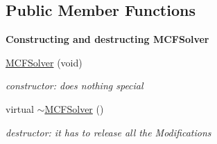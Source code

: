 \subsection*{Public Member Functions}
\begin{Indent}\textbf{ Constructing and destructing M\+C\+F\+Solver}\par
\begin{DoxyCompactItemize}
\item 
\mbox{\hyperlink{class_s_m_spp__di__unipi__it_1_1_m_c_f_solver_a351d0befbed3bfc9f32468a40411946f}{M\+C\+F\+Solver}} (void)
\begin{DoxyCompactList}\small\item\em constructor\+: does nothing special \end{DoxyCompactList}\item 
\mbox{\label{class_s_m_spp__di__unipi__it_1_1_m_c_f_solver_a20d6b656cb9edaae4e78d3ddb6fc4ed7}} 
virtual \mbox{\hyperlink{class_s_m_spp__di__unipi__it_1_1_m_c_f_solver_a20d6b656cb9edaae4e78d3ddb6fc4ed7}{$\sim$\+M\+C\+F\+Solver}} ()
\begin{DoxyCompactList}\small\item\em destructor\+: it has to release all the Modifications \end{DoxyCompactList}\end{DoxyCompactItemize}
\end{Indent}
